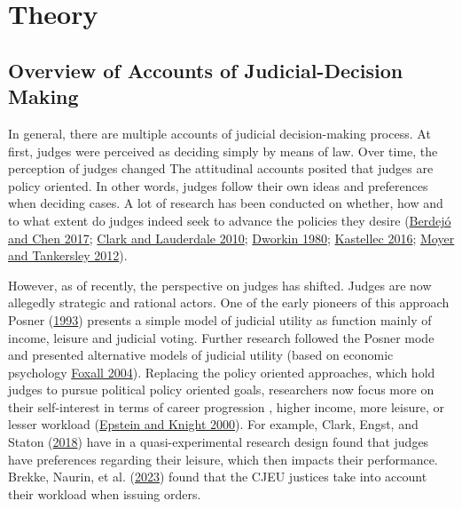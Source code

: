 \documentclass[
  11pt,
]{article}
\begin{document}
\hypertarget{theory}{%
\section{Theory}\label{theory}}

\hypertarget{overview-of-accounts-of-judicial-decision-making}{%
\subsection{Overview of Accounts of Judicial-Decision
Making}\label{overview-of-accounts-of-judicial-decision-making}}

In general, there are multiple accounts of judicial decision-making
process. At first, judges were perceived as deciding simply by means of
law. Over time, the perception of judges changed The attitudinal
accounts posited that judges are policy oriented. In other words, judges
follow their own ideas and preferences when deciding cases. A lot of
research has been conducted on whether, how and to what extent do judges
indeed seek to advance the policies they desire
(\protect\hyperlink{ref-berdejoElectoralCyclesUS2017}{Berdejó and Chen
2017}; \protect\hyperlink{ref-clarkLocatingSupremeCourt2010}{Clark and
Lauderdale 2010};
\protect\hyperlink{ref-dworkinPoliticalJudgesRule1980}{Dworkin 1980};
\protect\hyperlink{ref-kastellecEmpiricallyEvaluatingCountermajoritarian2016}{Kastellec
2016}; \protect\hyperlink{ref-moyerJudicialInnovationSexual2012}{Moyer
and Tankersley 2012}).

However, as of recently, the perspective on judges has shifted. Judges
are now allegedly strategic and rational actors. One of the early
pioneers of this approach Posner
(\protect\hyperlink{ref-posnerWhatJudgesJustices1993}{1993}) presents a
simple model of judicial utility as function mainly of income, leisure
and judicial voting. Further research followed the Posner mode and
presented alternative models of judicial utility (based on economic
psychology \protect\hyperlink{ref-foxallWhatJudgesMaximize2004}{Foxall
2004}). Replacing the policy oriented approaches, which hold judges to
pursue political policy oriented goals, researchers now focus more on
their self-interest in terms of career progression , higher income, more
leisure, or lesser workload
(\protect\hyperlink{ref-epsteinStrategicRevolutionJudicial2000}{Epstein
and Knight 2000}). For example, Clark, Engst, and Staton
(\protect\hyperlink{ref-clarkEstimatingEffectLeisure2018}{2018}) have in
a quasi-experimental research design found that judges have preferences
regarding their leisure, which then impacts their performance. Brekke,
Naurin, et al. (\protect\hyperlink{ref-brekkeThatOrderHow2023}{2023})
found that the CJEU justices take into account their workload when
issuing orders.
\end{document}
